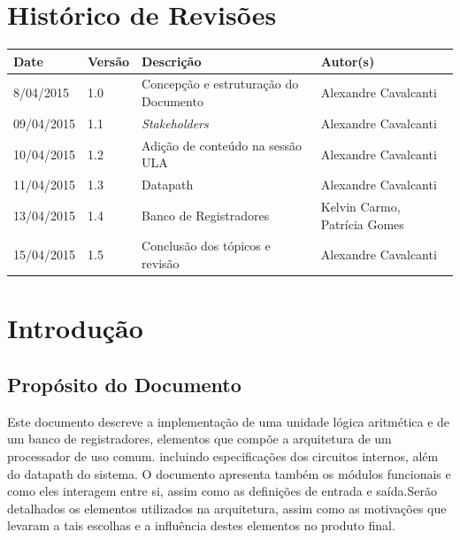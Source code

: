 \documentclass{report}
\begin{document}

\capa
\newpage
\newpage

\chapter*{Histórico de Revisões}
  \vspace*{1cm}
  \begin{table}[ht]
    \centering
    \begin{tabular}[pos]{|m{2cm} |m{2cm}| m{6cm} | m{3cm}|} 
      \hline
      \cellcolor[gray]{0.9}
      \textbf{Date} & \cellcolor[gray]{0.9} \textbf{Versão}  &\cellcolor[gray]{0.9}\textbf{Descrição} & \cellcolor[gray]{0.9}\textbf{Autor(s)}\\
      \hline
      8/04/2015 & 1.0 & Concepção e estruturação do Documento & Alexandre Cavalcanti \\ \hline      
      09/04/2015 & 1.1 & \textit{Stakeholders} & Alexandre Cavalcanti \\ \hline
      10/04/2015 & 1.2 & Adição de conteúdo na sessão ULA & Alexandre Cavalcanti \\ \hline      
      11/04/2015 & 1.3 & Datapath & Alexandre Cavalcanti \\ \hline      
      13/04/2015 & 1.4 & Banco de Registradores & Kelvin Carmo, Patrícia Gomes \\ \hline
      15/04/2015 & 1.5 & Conclusão dos tópicos e revisão & Alexandre Cavalcanti \\ \hline      
    \end{tabular}
  \end{table}

\tableofcontents

\chapter{Introdução}
  
  \section{Propósito do Documento}
  Este documento descreve a implementação de uma unidade lógica aritmética e de um banco de registradores, elementos que compõe a arquitetura de um processador de uso comum. incluindo especificações dos circuitos internos, além do datapath do sistema. O documento apresenta também os módulos funcionais e como eles interagem entre si, assim como as definições de entrada e saída.Serão detalhados os elementos utilizados na arquitetura, assim como as motivações que levaram a tais escolhas e a influência destes elementos no produto final.
  
\end{document}
